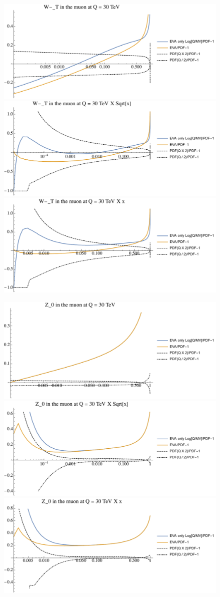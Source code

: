 \documentclass[a4paper,11pt]{article}
\begin{document}
\begin{figure}[ht]
\includegraphics[width=0.4\linewidth]{PlotPDFs/ratios/30TeV/W-_T_Q.pdf}
\includegraphics[width=0.4\linewidth]{PlotPDFs/ratios/30TeV/W-_T_Qsqrtx.pdf}
\includegraphics[width=0.4\linewidth]{PlotPDFs/ratios/30TeV/W-_T_Qx.pdf}
\end{figure}

\begin{figure}[ht]
\includegraphics[width=0.4\linewidth]{PlotPDFs/ratios/30TeV/Z_0_Q.pdf}
\includegraphics[width=0.4\linewidth]{PlotPDFs/ratios/30TeV/Z_0_Qsqrtx.pdf}
\includegraphics[width=0.4\linewidth]{PlotPDFs/ratios/30TeV/Z_0_Qx.pdf}
\end{figure}
\end{document}
